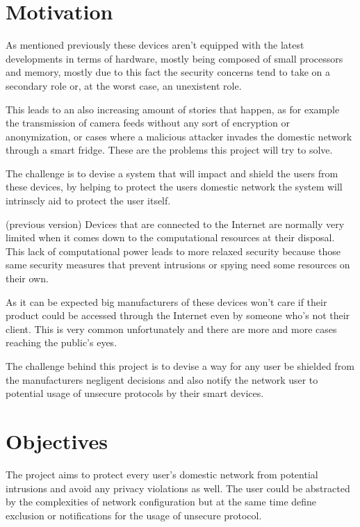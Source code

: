 

\section{Motivation}
\label{sec:mot}
As mentioned previously these devices aren't equipped with the latest
developments in terms of hardware, mostly being composed of small processors and
memory, mostly due to this fact the security concerns tend to take on a
secondary role or, at the worst case, an unexistent role.

This leads to an also increasing amount of stories that happen, as for example
the transmission of camera feeds without any sort of encryption or
anonymization, or cases where a malicious attacker invades the domestic network
through a smart fridge. These are the problems this project will try to solve.

The challenge is to devise a system that will impact and shield the users from
these devices, by helping to protect the users domestic network the system will
intrinscly aid to protect the user itself.

(previous version)
Devices that are connected to the Internet are normally very limited when it
comes down to the computational resources at their disposal. This lack of
computational power leads to more relaxed security because those same security
measures that prevent intrusions or spying need some resources on their own.

As it can be expected big manufacturers of these devices won't care if their
product could be accessed through the Internet even by someone who's not their
client. This is very common unfortunately and there are more and more cases
reaching the public's eyes.

The challenge behind this project is to devise a way for any user be shielded
from the manufacturers negligent decisions and also notify the network user to
potential usage of unsecure protocols by their smart devices.

\section{Objectives}
\label{sec:obj}
The project aims to protect every user's domestic network from potential
intrusions and avoid any privacy violations as well. The user could be
abstracted by the complexities of network configuration but at the same time
define exclusion or notifications for the usage of unsecure protocol.

